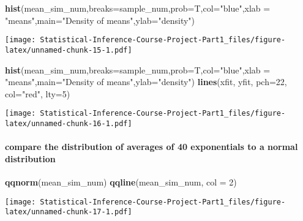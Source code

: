 \documentclass[
]{article}
\newenvironment{Shaded}{\begin{snugshade}}{\end{snugshade}}
\newcommand{\DataTypeTok}[1]{\textcolor[rgb]{0.13,0.29,0.53}{#1}}
\newcommand{\DecValTok}[1]{\textcolor[rgb]{0.00,0.00,0.81}{#1}}
\newcommand{\KeywordTok}[1]{\textcolor[rgb]{0.13,0.29,0.53}{\textbf{#1}}}
\newcommand{\NormalTok}[1]{#1}
\newcommand{\StringTok}[1]{\textcolor[rgb]{0.31,0.60,0.02}{#1}}
\begin{document}
\begin{Shaded}
\begin{Highlighting}[]
\KeywordTok{hist}\NormalTok{(mean\_sim\_num,}\DataTypeTok{breaks=}\NormalTok{sample\_num,}\DataTypeTok{prob=}\NormalTok{T,}\DataTypeTok{col=}\StringTok{"blue"}\NormalTok{,}\DataTypeTok{xlab =} \StringTok{"means"}\NormalTok{,}\DataTypeTok{main=}\StringTok{"Density of means"}\NormalTok{,}\DataTypeTok{ylab=}\StringTok{"density"}\NormalTok{)}
\end{Highlighting}
\end{Shaded}

\texttt{[image: Statistical-Inference-Course-Project-Part1\_files/figure-latex/unnamed-chunk-15-1.pdf]}

\begin{Shaded}
\begin{Highlighting}[]
\KeywordTok{hist}\NormalTok{(mean\_sim\_num,}\DataTypeTok{breaks=}\NormalTok{sample\_num,}\DataTypeTok{prob=}\NormalTok{T,}\DataTypeTok{col=}\StringTok{"blue"}\NormalTok{,}\DataTypeTok{xlab =} \StringTok{"means"}\NormalTok{,}\DataTypeTok{main=}\StringTok{"Density of means"}\NormalTok{,}\DataTypeTok{ylab=}\StringTok{"density"}\NormalTok{)}
\KeywordTok{lines}\NormalTok{(xfit, yfit, }\DataTypeTok{pch=}\DecValTok{22}\NormalTok{, }\DataTypeTok{col=}\StringTok{"red"}\NormalTok{, }\DataTypeTok{lty=}\DecValTok{5}\NormalTok{)}
\end{Highlighting}
\end{Shaded}

\texttt{[image: Statistical-Inference-Course-Project-Part1\_files/figure-latex/unnamed-chunk-16-1.pdf]}

\hypertarget{compare-the-distribution-of-averages-of-40-exponentials-to-a-normal-distribution}{%
\paragraph{compare the distribution of averages of 40 exponentials to a
normal
distribution}\label{compare-the-distribution-of-averages-of-40-exponentials-to-a-normal-distribution}}

\begin{Shaded}
\begin{Highlighting}[]
\KeywordTok{qqnorm}\NormalTok{(mean\_sim\_num)}
\KeywordTok{qqline}\NormalTok{(mean\_sim\_num, }\DataTypeTok{col =} \DecValTok{2}\NormalTok{)}
\end{Highlighting}
\end{Shaded}

\texttt{[image: Statistical-Inference-Course-Project-Part1\_files/figure-latex/unnamed-chunk-17-1.pdf]}
\end{document}
